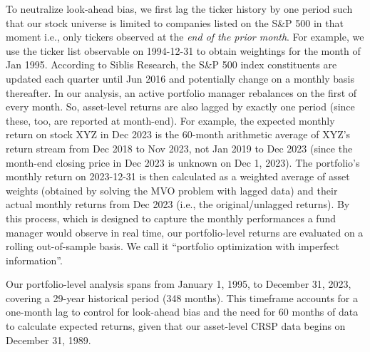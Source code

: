\documentclass[12pt,letterpaper]{article}
\begin{document}
\clearpage

To neutralize look-ahead bias, we first lag the ticker history by one period such that our stock universe is limited to companies listed on the S\&P 500 in that moment i.e., only tickers observed at the \textit{end of the prior month}. For example, we use the ticker list observable on 1994-12-31 to obtain weightings for the month of Jan 1995. According to Siblis Research, the S\&P 500 index constituents are updated each quarter until Jun 2016 and potentially change on a monthly basis thereafter. In our analysis, an active portfolio manager rebalances on the first of every month. So, asset-level returns are also lagged by exactly one period (since these, too, are reported at month-end). For example, the expected monthly return on stock XYZ in Dec 2023 is the 60-month arithmetic average of XYZ's return stream from Dec 2018 to Nov 2023, not Jan 2019 to Dec 2023 (since the month-end closing price in Dec 2023 is unknown on Dec 1, 2023). The portfolio's monthly return on 2023-12-31 is then calculated as a weighted average of asset weights (obtained by solving the MVO problem with lagged data) and their actual monthly returns from Dec 2023 (i.e., the original/unlagged returns). By this process, which is designed to capture the monthly performances a fund manager would observe in real time, our portfolio-level returns are evaluated on a rolling out-of-sample basis. We call it “portfolio optimization with imperfect information”.

Our portfolio-level analysis spans from January 1, 1995, to December 31, 2023, covering a 29-year historical period (348 months). This timeframe accounts for a one-month lag to control for look-ahead bias and the need for 60 months of data to calculate expected returns, given that our asset-level CRSP data begins on December 31, 1989.
\end{document}

